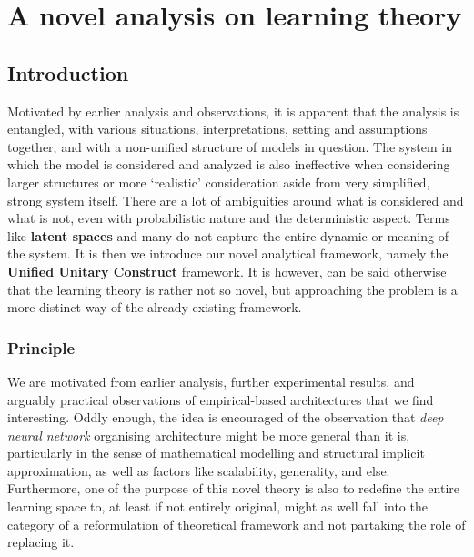 \chapter{A novel analysis on learning theory}
\section{Introduction}
Motivated by earlier analysis and observations, it is apparent that the analysis is entangled, with various situations, interpretations, setting and assumptions together, and with a non-unified structure of models in question. The system in which the model is considered and analyzed is also ineffective when considering larger structures or more `realistic' consideration aside from very simplified, strong system itself. There are a lot of ambiguities around what is considered and what is not, even with probabilistic nature and the deterministic aspect. Terms like \textbf{latent spaces} and many do not capture the entire dynamic or meaning of the system. It is then we introduce our novel analytical framework, namely the \textbf{Unified Unitary Construct} framework. It is however, can be said otherwise that the learning theory is rather not so novel, but approaching the problem is a more distinct way of the already existing framework. 

\subsection{Principle}

We are motivated from earlier analysis, further experimental results, and arguably practical observations of empirical-based architectures that we find interesting. Oddly enough, the idea is encouraged of the observation that \textit{deep neural network} organising architecture might be more general than it is, particularly in the sense of mathematical modelling and structural implicit approximation, as well as factors like scalability, generality, and else. Furthermore, one of the purpose of this novel theory is also to redefine the entire learning space to, at least if not entirely original, might as well fall into the category of a reformulation of theoretical framework and not partaking the role of replacing it. 

